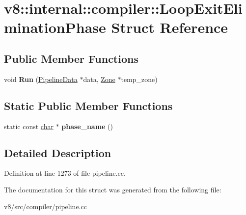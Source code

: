 \hypertarget{structv8_1_1internal_1_1compiler_1_1LoopExitEliminationPhase}{}\section{v8\+:\+:internal\+:\+:compiler\+:\+:Loop\+Exit\+Elimination\+Phase Struct Reference}
\label{structv8_1_1internal_1_1compiler_1_1LoopExitEliminationPhase}
\subsection*{Public Member Functions}
\begin{DoxyCompactItemize}
\item 
\mbox{\label{structv8_1_1internal_1_1compiler_1_1LoopExitEliminationPhase_a6f49b3e5e1773d5ca7bfdabd8615adf7}} 
void {\bfseries Run} (\mbox{\hyperlink{classv8_1_1internal_1_1compiler_1_1PipelineData}{Pipeline\+Data}} $\ast$data, \mbox{\hyperlink{classv8_1_1internal_1_1Zone}{Zone}} $\ast$temp\+\_\+zone)
\end{DoxyCompactItemize}
\subsection*{Static Public Member Functions}
\begin{DoxyCompactItemize}
\item 
\mbox{\label{structv8_1_1internal_1_1compiler_1_1LoopExitEliminationPhase_aef33167e865cb60a2757082b8ad6783b}} 
static const \mbox{\hyperlink{classchar}{char}} $\ast$ {\bfseries phase\+\_\+name} ()
\end{DoxyCompactItemize}


\subsection{Detailed Description}


Definition at line 1273 of file pipeline.\+cc.



The documentation for this struct was generated from the following file\+:\begin{DoxyCompactItemize}
\item 
v8/src/compiler/pipeline.\+cc\end{DoxyCompactItemize}

